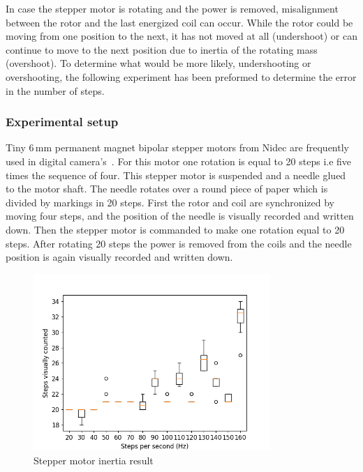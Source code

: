 In case the stepper motor is rotating and the power is removed, misalignment between the rotor and the last energized coil can occur.
While the rotor could be moving from one position to the next, it has not moved at all (undershoot) or can continue to move to the next position due to inertia of the rotating mass (overshoot). 
To determine what would be more likely, undershooting or overshooting, the following experiment has been preformed to determine the error in the number of steps.

\subsubsection{Experimental setup}

Tiny 6\,mm permanent magnet bipolar stepper motors from Nidec are frequently used in digital camera's~\cite{nidec_stepper_2017}.
For this motor one rotation is equal to 20 steps i.e five times the sequence of four.
This stepper motor is suspended and a needle glued to the motor shaft.
The needle rotates over a round piece of paper which is divided by markings in 20 steps.%
First the rotor and coil are synchronized by moving four steps, and the position of the needle is visually recorded and written down.  
Then the stepper motor is commanded to make one rotation equal to 20 steps.
After rotating 20 steps the power is removed from the coils and the needle position is again visually recorded and written down.

\begin{figure}
	\centering
	\includegraphics[width=0.8\textwidth]{pics/figure_intertia.png}
	\caption{Stepper motor inertia result}
	\label{fig:step_results}
\end{figure}


